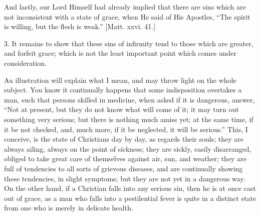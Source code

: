 And lastly, our Lord Himself had already implied that there are
sins which are not inconsistent with a state of grace, when He said of
His Apostles, ``The spirit is willing, but the flesh is
weak.'' [Matt. xxvi. 41.]

3. It remains to show that these sins of infirmity tend to those
which are greater, and forfeit grace; which is not the least important
point which comes under consideration.

Au illustration will explain what I mean, and may throw light on
the whole subject. You know it continually happens that some
indisposition overtakes a man, such that persons skilled in medicine,
when asked if it is dangerous, answer, ``Not at present, but they
do not know what will come of it; it may turn out something very
serious; but there is nothing much amiss yet; at the same time, if it
be not checked, and, much more, if it be neglected, it will be
serious.'' This, I conceive, is the state of Christians day by
day, as regards their souls; they are always ailing, always on the
point of sickness; they are sickly, easily disarranged, obliged to
take great care of themselves against air, sun, and weather; they are
full of tendencies to all sorts of grievous diseases, and are
continually showing these tendencies, in slight symptoms; but they are
not yet in a dangerous way. On the other hand, if a Christian falls
into any serious sin, then he is at once cast out of grace, as a man
who falls into a pestilential fever is quite in a distinct state from
one who is merely in delicate health.

